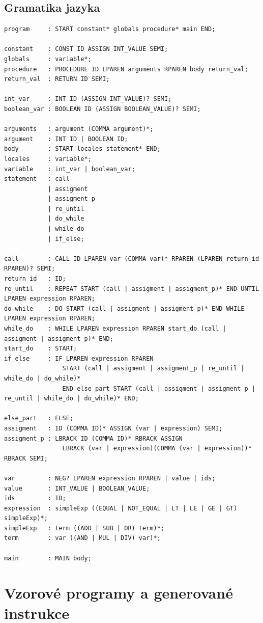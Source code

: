 \documentclass[12pt]{report}
\begin{document}
\section{Gramatika jazyka}
\begingroup
    \fontsize{8pt}{10pt}\selectfont
\begin{verbatim}
program     : START constant* globals procedure* main END;

constant    : CONST ID ASSIGN INT_VALUE SEMI;
globals     : variable*;
procedure   : PROCEDURE ID LPAREN arguments RPAREN body return_val;
return_val  : RETURN ID SEMI;

int_var     : INT ID (ASSIGN INT_VALUE)? SEMI;
boolean_var : BOOLEAN ID (ASSIGN BOOLEAN_VALUE)? SEMI;

arguments   : argument (COMMA argument)*;
argument    : INT ID | BOOLEAN ID;
body        : START locales statement* END;
locales     : variable*;
variable    : int_var | boolean_var;
statement   : call
            | assigment
            | assigment_p
            | re_until
            | do_while
            | while_do
            | if_else;

call        : CALL ID LPAREN var (COMMA var)* RPAREN (LPAREN return_id RPAREN)? SEMI;
return_id   : ID;
re_until    : REPEAT START (call | assigment | assigment_p)* END UNTIL LPAREN expression RPAREN;
do_while    : DO START (call | assigment | assigment_p)* END WHILE LPAREN expression RPAREN;
while_do    : WHILE LPAREN expression RPAREN start_do (call | assigment | assigment_p)* END;
start_do    : START;
if_else     : IF LPAREN expression RPAREN 
                START (call | assigment | assigment_p | re_until | while_do | do_while)* 
                END else_part START (call | assigment | assigment_p | re_until | while_do | do_while)* END;
				
else_part   : ELSE;
assigment   : ID (COMMA ID)* ASSIGN (var | expression) SEMI;
assigment_p : LBRACK ID (COMMA ID)* RBRACK ASSIGN 
                LBRACK (var | expression)(COMMA (var | expression))* RBRACK SEMI;

var         : NEG? LPAREN expression RPAREN | value | ids;
value       : INT_VALUE | BOOLEAN_VALUE;
ids         : ID;
expression  : simpleExp ((EQUAL | NOT_EQUAL | LT | LE | GE | GT) simpleExp)*;
simpleExp   : term ((ADD | SUB | OR) term)*;
term        : var ((AND | MUL | DIV) var)*;

main        : MAIN body;
\end{verbatim}
\endgroup

\chapter{Vzorové programy a generované instrukce}
\end{document}

